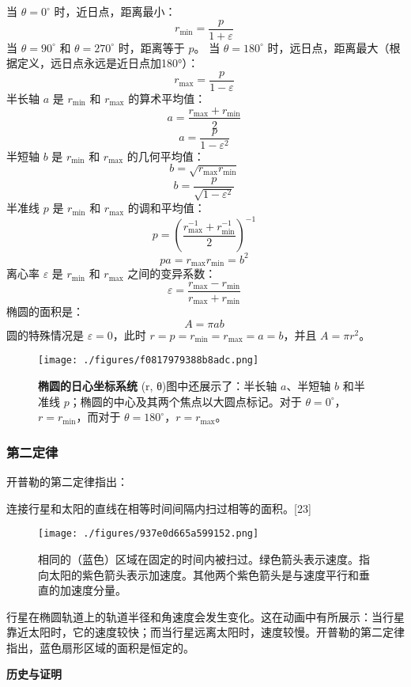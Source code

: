 当 \( \theta = 0^\circ \) 时，近日点，距离最小：
\[
r_{\min} = \frac{p}{1 + \varepsilon}~
\]
当 \( \theta = 90^\circ \) 和 \( \theta = 270^\circ \) 时，距离等于 \( p \)。
当 \( \theta = 180^\circ \) 时，远日点，距离最大（根据定义，远日点永远是近日点加180°）：
\[
r_{\max} = \frac{p}{1 - \varepsilon}~
\]
半长轴 \( a \) 是 \( r_{\min} \) 和 \( r_{\max} \) 的算术平均值：
\[
a = \frac{r_{\max} + r_{\min}}{2}~
\]
\[
a = \frac{p}{1 - \varepsilon^2}~
\]
半短轴 \( b \) 是 \( r_{\min} \) 和 \( r_{\max} \) 的几何平均值：
\[
b = \sqrt{r_{\max} r_{\min}}~
\]
\[
b = \frac{p}{\sqrt{1 - \varepsilon^2}}~
\]
半准线 \( p \) 是 \( r_{\min} \) 和 \( r_{\max} \) 的调和平均值：
\[
p = \left( \frac{r_{\max}^{-1} + r_{\min}^{-1}}{2} \right)^{-1}~
\]
\[pa = r_{\max} r_{\min} = b^2~\]
离心率 \( \varepsilon \) 是 \( r_{\min} \) 和 \( r_{\max} \) 之间的变异系数：
\[
\varepsilon = \frac{r_{\max} - r_{\min}}{r_{\max} + r_{\min}}~
\]
椭圆的面积是：
\[
A = \pi ab~
\]
圆的特殊情况是 \( \varepsilon = 0 \)，此时 \( r = p = r_{\min} = r_{\max} = a = b \)，并且 \( A = \pi r^2 \)。
\begin{figure}[ht]
\centering
\texttt{[image: ./figures/f0817979388b8adc.png]}
\caption{\textbf{椭圆的日心坐标系统} (r, θ)图中还展示了：半长轴 \(a\)、半短轴 \(b\) 和半准线 \(p\)；椭圆的中心及其两个焦点以大圆点标记。对于 \( \theta = 0^\circ \)，\( r = r_{\min} \)，而对于 \( \theta = 180^\circ \)，\( r = r_{\max} \)。} \label{fig_KPL_3}
\end{figure}
\subsubsection{第二定律}  
开普勒的第二定律指出：

连接行星和太阳的直线在相等时间间隔内扫过相等的面积。[23]
\begin{figure}[ht]
\centering
\texttt{[image: ./figures/937e0d665a599152.png]}
\caption{相同的（蓝色）区域在固定的时间内被扫过。绿色箭头表示速度。指向太阳的紫色箭头表示加速度。其他两个紫色箭头是与速度平行和垂直的加速度分量。} \label{fig_KPL_4}
\end{figure}
行星在椭圆轨道上的轨道半径和角速度会发生变化。这在动画中有所展示：当行星靠近太阳时，它的速度较快；而当行星远离太阳时，速度较慢。开普勒的第二定律指出，蓝色扇形区域的面积是恒定的。

\textbf{历史与证明}

